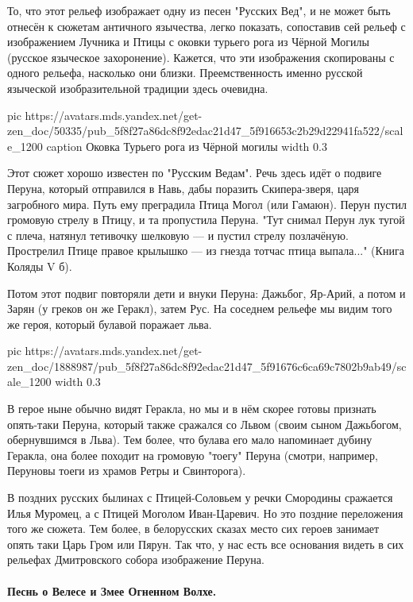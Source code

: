 То, что этот рельеф изображает одну из песен "Русских Вед", и не может быть
отнесён к сюжетам античного язычества, легко показать, сопоставив сей рельеф с
изображением Лучника и Птицы с оковки турьего рога из Чёрной Могилы (русское
языческое захоронение). Кажется, что эти изображения скопированы с одного
рельефа, насколько они близки. Преемственность именно русской языческой
изобразительной традиции здесь очевидна.

\ifcmt
pic https://avatars.mds.yandex.net/get-zen_doc/50335/pub_5f8f27a86dc8f92edac21d47_5f916653c2b29d22941fa522/scale_1200
caption Оковка Турьего рога из Чёрной могилы
  width 0.3
\fi

Этот сюжет хорошо известен по "Русским Ведам". Речь здесь идёт о подвиге
Перуна, который отправился в Навь, дабы поразить Скипера-зверя, царя загробного
мира. Путь ему преградила Птица Могол (или Гамаюн). Перун пустил громовую
стрелу в Птицу, и та пропустила Перуна. "Тут снимал Перун лук тугой с плеча,
натянул тетивочку шелковую — и пустил стрелу позлачёную. Прострелил Птице
правое крылышко — из гнезда тотчас птица выпала..." (Книга Коляды V б).

Потом этот подвиг повторяли дети и внуки Перуна: Дажьбог, Яр-Арий, а потом и
Зарян (у греков он же Геракл), затем Рус. На соседнем рельефе мы видим того же
героя, который булавой поражает льва. 

\ifcmt
pic https://avatars.mds.yandex.net/get-zen_doc/1888987/pub_5f8f27a86dc8f92edac21d47_5f91676c6ca69c7802b9ab49/scale_1200
  width 0.3
\fi

В герое ныне обычно видят Геракла, но мы и в нём скорее готовы признать
опять-таки Перуна, который также сражался со Львом (своим сыном Дажьбогом,
обернувшимся в Льва). Тем более, что булава его мало напоминает дубину Геракла,
она более походит на громовую "тоегу" Перуна (смотри, например, Перуновы тоеги
из храмов Ретры и Свинторога).

В поздних русских былинах с Птицей-Соловьем у речки Смородины сражается Илья
Муромец, а с Птицей Моголом Иван-Царевич. Но это поздние переложения того же
сюжета. Тем более, в белорусских сказах место сих героев занимает опять таки
Царь Гром или Пярун. Так что, у нас есть все основания видеть в сих рельефах
Дмитровского собора изображение Перуна.

\paragraph{Песнь о Велесе и Змее Огненном Волхе.}

